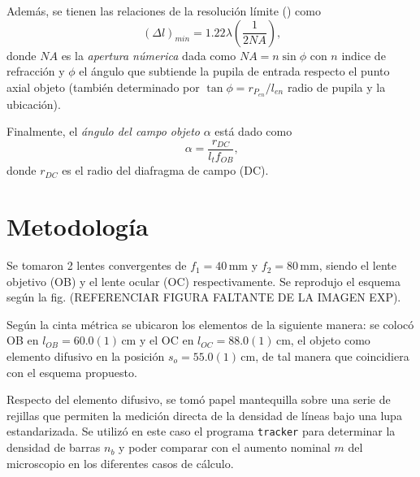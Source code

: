 \documentclass[letterpaper]{article}
\begin{document}
Además, se tienen las relaciones de la resolución límite (\cite{Yobani_Optica2020}) como
\begin{equation}
    (\Delta l)_{min} = 1.22 \lambda \left(\frac{1}{2 NA}\right) \textbf{,}
\end{equation}
donde $NA$ es la \textit{apertura númerica} dada como $NA = n \sin \phi$ con $n$ indice de refracción y $\phi$ el ángulo que subtiende la pupila de entrada respecto el punto axial objeto (también determinado por $\tan \phi = r_{P_{en}}/l_{en}$ radio de pupila y la ubicación).

Finalmente, el \textit{ángulo del campo objeto} $\alpha$ está dado como
\begin{equation}
    \alpha = \frac{r_{DC}}{l_t f_{OB}} \text{,}
\end{equation}
donde $r_{DC}$ es el radio del diafragma de campo (DC).

\section*{Metodología} \label{sec:metodologia}

Se tomaron 2 lentes convergentes de $f_1 = 40 \, \unit{\milli \meter}$ y $f_2 = 80 \, \unit{\milli \meter}$, siendo el lente objetivo (OB) y el lente ocular (OC) respectivamente. Se reprodujo el esquema según la fig. (REFERENCIAR FIGURA FALTANTE DE LA IMAGEN EXP). 

Según la cinta métrica se ubicaron los elementos de la siguiente manera: se colocó OB en $l_{OB} = 60.0(1) \, \unit{\centi \meter}$ y el OC en $l_{OC} = 88.0(1) \, \unit{\centi \meter}$, el objeto como elemento difusivo en la posición $s_o = 55.0(1) \, \unit{\centi \meter}$, de tal manera que coincidiera con el esquema propuesto.

Respecto del elemento difusivo, se tomó papel mantequilla sobre una serie de rejillas que permiten la medición directa de la densidad de líneas bajo una lupa estandarizada. Se utilizó en este caso el programa \texttt{tracker} para determinar la densidad de barras $n_b$ y poder comparar con el aumento nominal $m$ del microscopio en los diferentes casos de cálculo.
\end{document}
